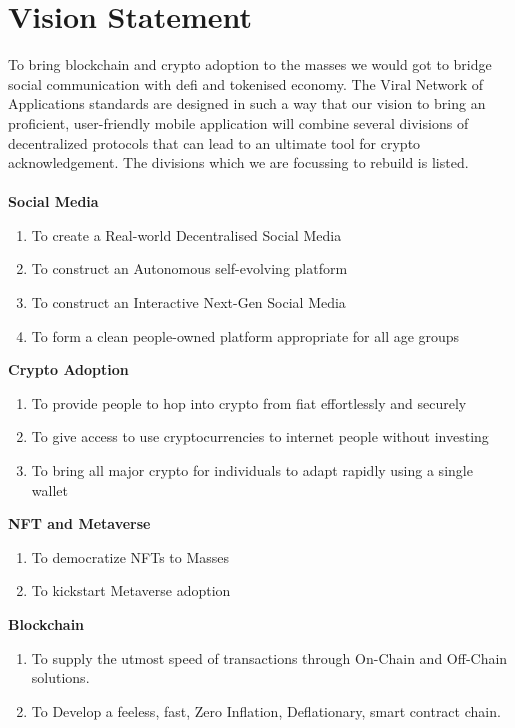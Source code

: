 \documentclass[conference]{IEEEtran}
\begin{document}
\section{\textbf{Vision Statement}}
To bring blockchain and crypto adoption to the masses we would got to bridge social communication with defi and tokenised economy. The Viral Network of Applications standards are designed in such a way that our vision to bring an proficient, user-friendly mobile application will combine several divisions of decentralized protocols that can lead to an ultimate tool for crypto acknowledgement. The divisions which we are focussing to rebuild is listed.\\
\\
\textbf{Social Media}
\begin{enumerate}[wide, labelwidth=!, labelindent=0pt]
\item To create a Real-world Decentralised Social Media
\item To construct an Autonomous self-evolving platform
\item To construct an Interactive Next-Gen Social Media
\item To form a clean people-owned platform appropriate for all age groups
\end{enumerate}
\textbf{Crypto Adoption}
\begin{enumerate}[wide, labelwidth=!, labelindent=0pt]
\item To provide people to hop into crypto from fiat effortlessly and securely
\item To give access to use cryptocurrencies to internet people without investing
\item To bring all major crypto for individuals to adapt rapidly using a single wallet
\end{enumerate}
\textbf{NFT and Metaverse}
\begin{enumerate}[wide, labelwidth=!, labelindent=0pt]
\item To democratize NFTs to Masses
\item To kickstart Metaverse adoption
\end{enumerate}
\textbf{Blockchain}
\begin{enumerate}[wide, labelwidth=!, labelindent=0pt]
\item To supply the utmost speed of transactions through On-Chain and Off-Chain solutions.
\item To Develop a feeless, fast, Zero Inflation, Deflationary, smart contract chain.
\end{enumerate}
\end{document}
